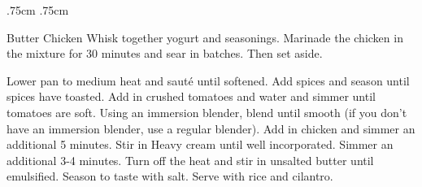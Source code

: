 \documentclass[]{article}
\title{}
\author{}
\begin{document}
\RecipeWidths{\textwidth}{3cm}{0.5cm}{5cm} {.75cm} {.75cm}
\begin{recipe}{Butter Chicken}{}{}	
	Whisk together yogurt and seasonings. Marinade the chicken in the mixture for 30 minutes and sear in batches. Then set aside. 
	
	Lower pan to medium heat and sauté until softened. 
	Add spices and season until spices have toasted.
	Add in crushed tomatoes and water and simmer until tomatoes are soft. Using an immersion blender, blend until smooth (if you don't have an immersion blender, use a regular blender). Add in chicken and simmer an additional 5 minutes.
	Stir in Heavy cream until well incorporated. Simmer an additional 3-4 minutes.
	Turn off the heat and stir in unsalted butter until emulsified. Season to taste with salt. Serve with rice and cilantro.
\end{recipe}
\end{document}
